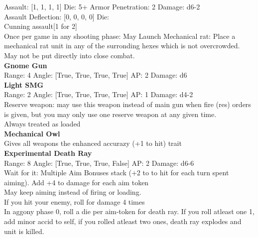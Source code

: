 Assault: [1, 1, 1, 1] Die: 5+ Armor Penetration: 2 Damage: d6-2 \\
Assault Deflection: [0, 0, 0, 0] Die: \\
\indent Cunning assault[1 for 2]\\ 
 

Once per game in any shooting phase: May Launch Mechanical rat: Place a mechanical rat unit in any of the surronding hexes which is not overcrowded. May not be put directly into close combat. \\ 


{\bf Gnome Gun } \\



Range: 4  Angle: [True, True, True, True] AP: 2 Damage: d6 \\




{\bf Light SMG } \\



Range: 2  Angle: [True, True, True, True] AP: 1 Damage: d4-2 \\
Reserve weapon: may use this weapon instead of main gun when fire (res) orders is given, but you may only use one reserve weapon at any given time.\\ 
Always treated as loaded\\ 




{\bf Mechanical Owl } \\

Gives all weapons the enhanced accurazy (+1 to hit) trait\\ 





{\bf Experimental Death Ray } \\



Range: 8  Angle: [True, True, True, False] AP: 2 Damage: d6-6 \\
Wait for it: Multiple Aim Bonuses stack (+2 to to hit for each turn spent aiming). Add +4 to damage for each aim token\\ 
May keep aiming instead of firing or loading.\\ 
If you hit your enemy, roll for damage 4 times\\ 
In aggony phase 0, roll a die per aim-token for death ray. If you roll atleast one 1, add minor accid to self, if you rolled atleast two ones, death ray explodes and unit is killed.\\ 




